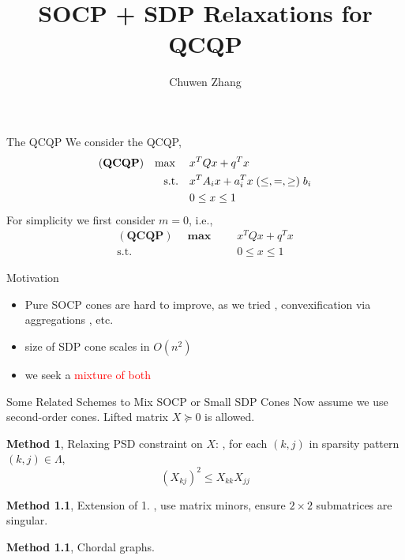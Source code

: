 \documentclass[aspectratio=1610, 10pt]{beamer}
\newcommand{\model}[1]{(\textbf{#1})}
\newcommand{\mx}{\mathbf{\max}\;}
\newcommand{\red}[1]{\textcolor{red}{#1}}
\begin{document}
\title{SOCP + SDP Relaxations for QCQP}

\author{
  Chuwen Zhang
}


\maketitle
\begin{frame}{The QCQP}
  We consider the QCQP,
  \begin{equation}
    \label{eq:inhoqcqp}
    \begin{aligned}
      \model{QCQP} \quad \mx \quad & x^T Qx + q^T x                                    \\
      \textrm{s.t.} \quad          & x^T A_i x + a_i^T x \hspace{0.27em} (\le, =, \ge)
      \hspace{0.27em} b_i                                                              \\
                                   & 0 \le x \le 1
    \end{aligned}
  \end{equation}
  For simplicity we first consider \(m = 0\), i.e.,
  \begin{equation}
    \label{eq:inhoqcqp.box}
    \begin{aligned}
      \model{QCQP} \quad \mx \quad & x^T Qx + q^T x \\
      \textrm{s.t.} \quad          & 0 \le x \le 1
    \end{aligned}
  \end{equation}
\end{frame}
\begin{frame}[allowframebreaks]{Motivation}
  \begin{itemize}
    \item Pure SOCP cones are hard to improve, as we tried \cite{bienstock_cutting-planes_2014}, convexification via aggregations \cite{burer_how_2017}, etc.
    \item size of SDP cone scales in \(O(n^2)\)
    \item we seek a \red{mixture of both}
  \end{itemize}
\end{frame}
\begin{frame}[allowframebreaks]{Some Related Schemes to Mix SOCP or Small SDP Cones}
  Now assume we use second-order cones. Lifted matrix \(X \succeq 0\) is allowed.

  \textbf{Method 1}, Relaxing PSD constraint on \(X\): \cite{kim_exact_2003}, for each \((k, j)\) in sparsity pattern \((k, j) \in \Lambda\),
  \begin{equation*}
    (X_{k j})^{2} \leq X_{k k} X_{j j}
  \end{equation*}

  \textbf{Method 1.1}, Extension of 1. \cite{kocuk_matrix_2018}, use matrix minors, ensure \(2\times 2\) submatrices are singular.


  \textbf{Method 1.1}, Chordal graphs. \cite{fukuda_exploiting_2001}

\end{frame}
\end{document}
